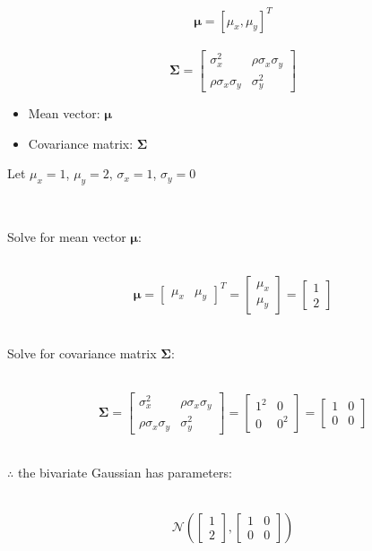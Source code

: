 \documentclass{article}
\begin{document}
$$\boldsymbol{\mu} = [\mu_x, \mu_y]^T$$\\
$$\boldsymbol{\Sigma} = \begin{bmatrix} \sigma_x^2 & \rho\sigma_x\sigma_y \\ \rho\sigma_x\sigma_y & \sigma_y^2 \end{bmatrix}$$

\begin{itemize}
    \item Mean vector: $\boldsymbol{\mu}$
    \item Covariance matrix: $\boldsymbol{\Sigma}$
\end{itemize}

\parbox{\textwidth}{Let $\mu_x = 1$, $\mu_y = 2$, $\sigma_x = 1$, $\sigma_y = 0$}\\

\parbox{\textwidth}{Solve for mean vector $\boldsymbol{\mu}$:}\\

$$\boldsymbol{\mu} = \begin{bmatrix} \mu_x & \mu_y \end{bmatrix}^T = \begin{bmatrix}
    \mu_x \\
    \mu_y
\end{bmatrix} = \begin{bmatrix}
    1 \\
    2
\end{bmatrix}$$\\

\parbox{\textwidth}{Solve for covariance matrix $\boldsymbol{\Sigma}$:}\\

$$\boldsymbol{\Sigma} = \begin{bmatrix} \sigma_x^2 & \rho\sigma_x\sigma_y \\ \rho\sigma_x\sigma_y & \sigma_y^2 \end{bmatrix} = \begin{bmatrix} 1^2 & 0 \\ 0 & 0^2\end{bmatrix} = \begin{bmatrix} 1 & 0 \\ 0 & 0\end{bmatrix}$$\\

\parbox{\textwidth}{$\therefore$ the bivariate Gaussian has parameters:}\\

$$\mathcal{N}\left(\begin{bmatrix} 1 \\ 2 \end{bmatrix}, \begin{bmatrix} 
    1 & 0 \\
    0 & 0
\end{bmatrix}\right)$$
\end{document}
